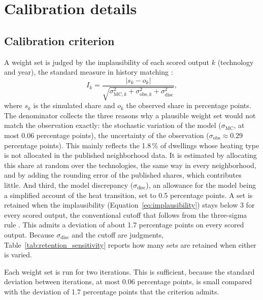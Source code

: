 \documentclass[preprint,12pt,authoryear]{elsarticle}
\begin{document}
\section{Calibration details}

\subsection{Calibration criterion}
\label{app:calibration}
A weight set is judged by the implausibility of each scored output $k$
(technology and year), the standard measure in history matching
\citep{vernonGalaxyFormationBayesian2010,
andrianakisBayesianHistoryMatching2015}:
\begin{equation}
  I_k = \frac{\lvert s_k - o_k \rvert}{\sqrt{\sigma_{\mathrm{MC},k}^2 +
  \sigma_{\mathrm{obs},k}^2 + \sigma_{\mathrm{disc}}^2}},
  \label{eq:implausibility}
\end{equation}
where $s_k$ is the simulated share and $o_k$ the observed share in percentage
points. The denominator collects the three reasons why a plausible weight set
would not match the observation exactly: the stochastic variation of the
model ($\sigma_{\mathrm{MC}}$, at most 0.06 percentage points), 
the uncertainty of the observation ($\sigma_{\mathrm{obs}} \approx 0.29$
percentage points). This mainly reflects the 1.8\,\% of dwellings whose
heating type is not allocated in the published neighborhood data. It is
estimated by allocating this share at random over the technologies, the
same way in every neighborhood, and by adding the rounding error of the
published shares, which contributes little. And third, the model
discrepancy ($\sigma_{\mathrm{disc}}$), an allowance for the model being a
simplified account of the heat transition, set to 0.5 percentage points. A
set is retained when the implausibility (Equation~\ref{eq:implausibility})
stays below 3 for every scored output, the conventional cutoff that follows
from the three-sigma rule \citep{pukelsheimThreeSigmaRule1994}. This admits
a deviation of about 1.7 percentage points on every scored output. Because
$\sigma_{\mathrm{disc}}$ and the cutoff are judgments,
Table~\ref{tab:retention_sensitivity} reports how many sets are retained when
either is varied.

Each weight set is run for two iterations. This is sufficient, because the
standard deviation between iterations, at most 0.06 percentage points, is
small compared with the deviation of 1.7 percentage points that the
criterion admits.
\end{document}
